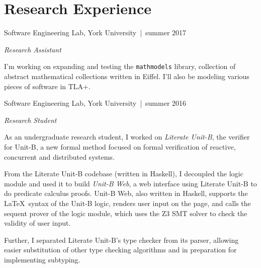 \documentclass[12pt,letterpaper]{article}
\renewenvironment{itemize}{
  \begin{list}{}{
    \setlength{\leftmargin}{1.5em}
    \setlength{\itemsep}{0.25em}
    \setlength{\parskip}{0pt}
    \setlength{\parsep}{0.25em}
  }
}{
  \end{list}
}
\begin{document}
\section*{Research Experience}

\begin{itemize}
\item {\large Software Engineering Lab, } York University\, |\, {\small summer
  2017}

  \textit{Research Assistant}

  \begin{itemize}
  \item I'm working on expanding and testing the \texttt{mathmodels} library,
    collection of abstract mathematical collections written in Eiffel. I'll also
    be modeling various pieces of software in TLA+.
  \end{itemize}

\item {\large Software Engineering Lab, } York University\, |\, {\small summer 2016}

  \textit{Research Student}

  \begin{itemize}
  \item As an undergraduate research student, I worked on \textit{Literate
      Unit-B}, the verifier for Unit-B, a new formal method focused on formal
    verification of reactive, concurrent and distributed systems.

    From the Literate Unit-B codebase (written in Haskell), I decoupled the
    logic module and used it to build \textit{Unit-B Web}, a web interface using
    Literate Unit-B to do predicate calculus proofs. \linebreak Unit-B Web, also
    written in Haskell, supports the \LaTeX\ syntax of the Unit-B logic, renders
    user input on the page, and calls the sequent prover of the logic module,
    which uses the Z3 SMT solver to check the validity of user input.

  \item Further, I separated Literate Unit-B's type checker from its parser,
    allowing easier substitution of other type checking algorithms and in
    preparation for implementing subtyping.
  \end{itemize}
\end{itemize}
\end{document}
